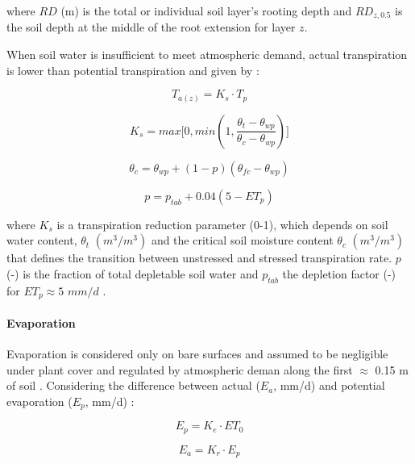 \documentclass[]{article}
\let\oldparagraph\paragraph
\renewcommand{\paragraph}[1]{\oldparagraph{#1}\mbox{}}
\begin{document}
where \(RD\) (m) is the total or individual soil layer's rooting depth
and \(RD_{z, 0.5}\) is the soil depth at the middle of the root
extension for layer \(z\).

When soil water is insufficient to meet atmospheric demand, actual
transpiration is lower than potential transpiration and given by
\citep{Sheikh2009}:

\begin{equation}
T_{a(z)} = K_s \cdot T_p
\label{eq:Taz}  
\end{equation}

\begin{equation}
K_s= max \Big[ 0, min(1, \frac{\theta_t - \theta_{wp} }{ \theta_c - \theta_{wp} }) \Big]
\label{eq:Ks}  
\end{equation}

\begin{equation}
\theta_c = \theta_{wp} + (1 - p)(\theta_{fc}- \theta_{wp}) 
\label{eq:theta_c}  
\end{equation}

\begin{equation}
p = p_{tab} + 0.04(5-ET_p)
\label{eq:p}  
\end{equation}

where \(K_s\) is a transpiration reduction parameter (0-1), which
depends on soil water content, \(\theta_t\) \((m^3/m^3)\) and the
critical soil moisture content \(\theta_c\) \((m^3/m^3)\) that defines
the transition between unstressed and stressed transpiration rate. \(p\)
(-) is the fraction of total depletable soil water and \(p_{tab}\) the
depletion factor (-) for \(ET_p \approx 5\) \(mm/d\) \citep[Table no.
22]{Allen1998}.

\paragraph{Evaporation}\label{evaporation}

Evaporation is considered only on bare surfaces and assumed to be
negligible under plant cover and regulated by atmospheric deman along
the first \(\approx\) 0.15 m of soil \citep{Sheikh2009}. Considering the
difference between actual (\(E_a\), mm/d) and potential evaporation
(\(E_p\), mm/d) \citep{Allen1998}:

\begin{equation}
E_p=K_e \cdot ET_0
\label{eq:Ep}  
\end{equation}

\begin{equation}
E_a=K_r \cdot E_p
\label{eq:Ea}  
\end{equation}
\end{document}
